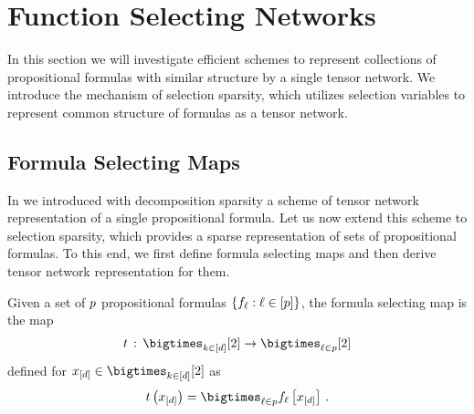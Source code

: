 \section{Function Selecting Networks}\label{sec:functionSelection}

In this section we will investigate efficient schemes to represent collections of propositional formulas with similar structure by a single tensor network.
We introduce the mechanism of selection sparsity, which utilizes selection variables to represent common structure of formulas as a tensor network.

\subsection{Formula Selecting Maps}

In  we introduced with decomposition sparsity a scheme of tensor network representation of a single propositional formula.
Let us now extend this scheme to selection sparsity, which provides a sparse representation of sets of propositional formulas.
To this end, we first define formula selecting maps and then derive tensor network representation for them.

\begin{definition}
    Given a set of $p$ propositional formulas $\{f_{\ell} : \ell\in[p]\}$, the formula selecting map is the map
    \begin{align*}
        \fselectionmap \defcols \atomstates \rightarrow \bigtimes_{\selindex\in\seldim} [2]
    \end{align*}
    defined for $\shortcatindices\in\atomstates$ as
    \begin{align*}
        \fselectionmapat{\shortcatindices}
        = \bigtimes_{\selindex\in\seldim} \formulaofat{\selindex}{\shortcatindices} \, .
    \end{align*}
\end{definition}

